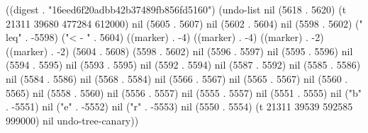 
((digest . "16eed6f20adbb42b37489fb856fd5160") (undo-list nil (5618 . 5620) (t 21311 39680 477284 612000) nil (5605 . 5607) nil (5602 . 5604) nil (5598 . 5602) ("\\leq" . -5598) ("<
-
" . 5604) ((marker) . -4) ((marker) . -4) ((marker) . -2) ((marker) . -2) (5604 . 5608) (5598 . 5602) nil (5596 . 5597) nil (5595 . 5596) nil (5594 . 5595) nil (5593 . 5595) nil (5592 . 5594) nil (5587 . 5592) nil (5585 . 5586) nil (5584 . 5586) nil (5568 . 5584) nil (5566 . 5567) nil (5565 . 5567) nil (5560 . 5565) nil (5558 . 5560) nil (5556 . 5557) nil (5555 . 5557) nil (5551 . 5555) nil ("b" . -5551) nil ("e" . -5552) nil ("r" . -5553) nil (5550 . 5554) (t 21311 39539 592585 999000) nil undo-tree-canary))
